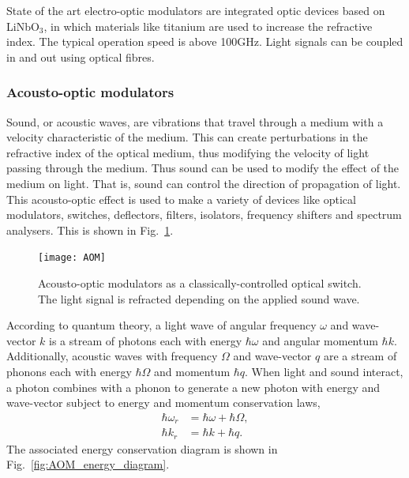 State of the art electro-optic modulators are integrated optic devices based on LiNbO$_3$, in which materials like titanium are used to increase the refractive index. The typical operation speed is above 100GHz. Light signals can be coupled in and out using optical fibres.

%
%

\subsubsection{Acousto-optic modulators} 

Sound, or acoustic waves, are vibrations that travel through a medium with a velocity characteristic of the medium. This can create perturbations in the refractive index of the optical medium, thus modifying the velocity of light passing through the medium. Thus sound can be used to modify the effect of the medium on light. That is, sound can control the direction of propagation of light. This acousto-optic effect is used to make a variety of devices like optical modulators, switches, deflectors, filters, isolators, frequency shifters and spectrum analysers. This is shown in Fig.~\ref{fig:AOM}.

\begin{figure}[!htbp]
\texttt{[image: AOM]}
\captionspacefig \caption{Acousto-optic modulators as a classically-controlled optical switch. The light signal is refracted depending on the applied sound wave.}\label{fig:AOM}
\end{figure}

According to quantum theory, a light wave of angular frequency $\omega$ and wave-vector $k$ is a stream of photons each with energy $\hbar\omega$ and angular momentum $\hbar k$. Additionally, acoustic waves with frequency $\Omega$ and wave-vector $q$ are a stream of phonons each with energy $\hbar\Omega$ and momentum $\hbar q$. When light and sound interact, a photon combines with a phonon to generate a new photon with energy and wave-vector subject to energy and momentum conservation laws, 
\begin{align}\label{eq:AOM_energy}
\hbar\omega_r &= \hbar\omega + \hbar\Omega,\nonumber\\
\hbar k_r &= \hbar k + \hbar q.
\end{align}
The associated energy conservation diagram is shown in Fig.~\ref{fig:AOM_energy_diagram}.

